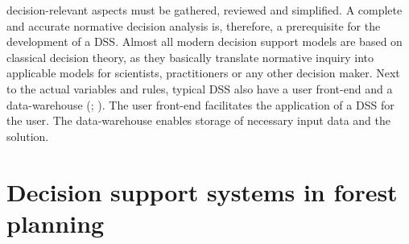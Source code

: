 decision-relevant aspects must be gathered, reviewed and simplified. A complete and accurate normative decision analysis is, therefore, a prerequisite for the development of a DSS. Almost all modern decision support models are based on classical decision theory, as they basically translate normative inquiry into applicable models for scientists, practitioners or any other decision maker. Next to the actual variables and rules, typical DSS also have a user front-end and a data-warehouse (\citealp[p. 2]{hansen_2012}; \citealp[p. 115]{shim_2002}). The user front-end facilitates the application of a DSS for the user. The data-warehouse enables storage of necessary input data and the solution.

\section{Decision support systems in forest planning}
\label{sec:intro:dss}
